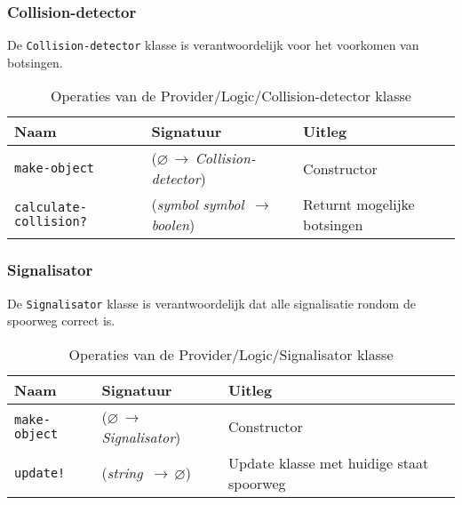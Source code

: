 \documentclass[a4paper, 11pt]{article}
\newcommand{\naar}{\,$\rightarrow$\,}
\renewcommand{\empty}{$\varnothing$}
\newcommand{\<}{\scriptsize\textless\normalsize}
\renewcommand{\>}{\scriptsize\textgreater\normalsize}
\begin{document}
\subsubsection{Collision-detector} %
De \texttt{Collision-detector} klasse is verantwoordelijk voor het voorkomen van botsingen.
\begin{table}[H]
	\begin{center}
		{
		\begin{tabular}{|l l l|}
			\hline
			\textbf{Naam} & \textbf{Signatuur} & \textbf{Uitleg}\\
			\hline
			\texttt{make-object} & (\empty \naar \textit{Collision-detector}) & Constructor\\
			\hline
			\texttt{calculate-collision?} & (\textit{symbol} \textit{symbol} \naar \textit{boolen}) & Returnt mogelijke botsingen\\
			\hline
		\end{tabular}}
		\caption{Operaties van de Provider/Logic/Collision-detector klasse}
	\end{center}
\end{table}

\subsubsection{Signalisator} %
De \texttt{Signalisator} klasse is verantwoordelijk dat alle signalisatie rondom de spoorweg correct is.
\begin{table}[H]
	\begin{center}
		{
		\begin{tabular}{|l l l|}
			\hline
			\textbf{Naam} & \textbf{Signatuur} & \textbf{Uitleg}\\
			\hline
			\texttt{make-object} & (\empty \naar \textit{Signalisator}) & Constructor\\
			\hline
			\texttt{update!} & (\textit{string} \naar \empty) & Update klasse met huidige staat spoorweg\\
			\hline
		\end{tabular}}
		\caption{Operaties van de Provider/Logic/Signalisator klasse}
	\end{center}
\end{table}
\end{document}
